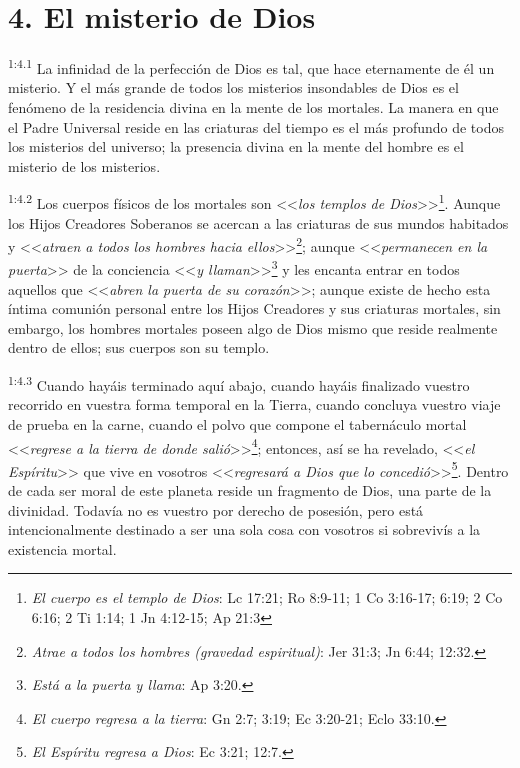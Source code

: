 \section*{4. El misterio de Dios}
\par
\textsuperscript{1:4.1} La infinidad de la perfección de Dios es tal, que hace eternamente de él un misterio. Y el más grande de todos los misterios insondables de Dios es el fenómeno de la residencia divina en la mente de los mortales. La manera en que el Padre Universal reside en las criaturas del tiempo es el más profundo de todos los misterios del universo; la presencia divina en la mente del hombre es el misterio de los misterios.

\par
\textsuperscript{1:4.2} Los cuerpos físicos de los mortales son <<\textit{los templos de Dios}>>\footnote{\textit{El cuerpo es el templo de Dios}: Lc 17:21; Ro 8:9-11; 1 Co 3:16-17; 6:19; 2 Co 6:16; 2 Ti 1:14; 1 Jn 4:12-15; Ap 21:3}. Aunque los Hijos Creadores Soberanos se acercan a las criaturas de sus mundos habitados y <<\textit{atraen a todos los hombres hacia ellos}>>\footnote{\textit{Atrae a todos los hombres (gravedad espiritual)}: Jer 31:3; Jn 6:44; 12:32.}; aunque <<\textit{permanecen en la puerta}>> de la conciencia <<\textit{y llaman}>>\footnote{\textit{Está a la puerta y llama}: Ap 3:20.} y les encanta entrar en todos aquellos que <<\textit{abren la puerta de su corazón}>>; aunque existe de hecho esta íntima comunión personal entre los Hijos Creadores y sus criaturas mortales, sin embargo, los hombres mortales poseen algo de Dios mismo que reside realmente dentro de ellos; sus cuerpos son su templo.

\par
\textsuperscript{1:4.3} Cuando hayáis terminado aquí abajo, cuando hayáis finalizado vuestro recorrido en vuestra forma temporal en la Tierra, cuando concluya vuestro viaje de prueba en la carne, cuando el polvo que compone el tabernáculo mortal <<\textit{regrese a la tierra de donde salió}>>\footnote{\textit{El cuerpo regresa a la tierra}: Gn 2:7; 3:19; Ec 3:20-21; Eclo 33:10.}; entonces, así se ha revelado, <<\textit{el Espíritu}>> que vive en vosotros <<\textit{regresará a Dios que lo concedió}>>\footnote{\textit{El Espíritu regresa a Dios}: Ec 3:21; 12:7.}. Dentro de cada ser moral de este planeta reside un fragmento de Dios, una parte de la divinidad. Todavía no es vuestro por derecho de posesión, pero está intencionalmente destinado a ser una sola cosa con vosotros si sobrevivís a la existencia mortal.

